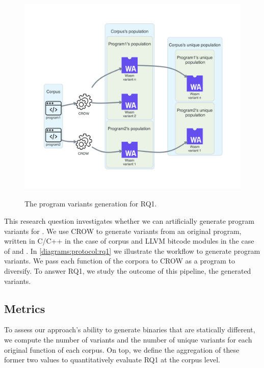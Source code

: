 
\section{\rqone}
\label{rq1:method}


\begin{figure}[h]
    \centering
    \includegraphics[height=4.1in]{diagrams/RQ1.pdf}
    \caption{The program variants generation for RQ1.}
    \label{diagrams:protocol:rq1}
\end{figure}


This research question investigates whether we can artificially generate program variants for \wasm. We use CROW to generate variants from an original program, written in C/C++ in the case of \corpusrosetta corpus and LLVM bitcode modules in the case of \corpussodium and \corpusqrcode. 
In \autoref{diagrams:protocol:rq1} we illustrate the workflow to generate \wasm program variants. We pass each function of the corpora to CROW as a program to diversify. To answer RQ1, we study the outcome of this pipeline, the generated \wasm variants. 


\subsection*{Metrics}

To assess our approach's ability to generate \wasm binaries that are statically different, we compute the number of variants and the number of unique variants for each original function of each corpus. 
On top, we define the aggregation of these former two values to quantitatively evaluate RQ1 at the corpus level. 

